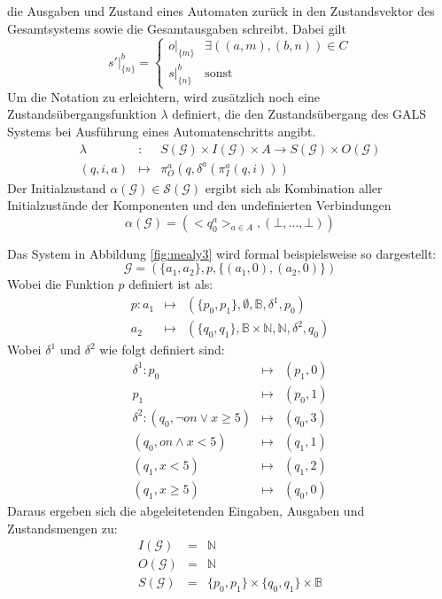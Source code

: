 die Ausgaben und Zustand eines Automaten zurück in den Zustandsvektor des Gesamtsystems sowie die Gesamtausgaben schreibt.
Dabei gilt
\[ s'|_{\{n\}}^b = \left\{\begin{array}{lr}
    o|_{\{m\}} & \exists ((a,m),(b,n))\in C\\[10pt]
    s|_{\{n\}}^b & \textrm{sonst}
  \end{array}\right. \]
Um die Notation zu erleichtern, wird zusätzlich noch eine Zustandsübergangsfunktion $\lambda$ definiert, die den Zustandsübergang des GALS Systems bei Ausführung eines Automatenschritts angibt.
\begin{eqnarray*}
  \lambda &:& S(\mathcal{G})\times I(\mathcal{G})\times A\rightarrow S(\mathcal{G})\times O(\mathcal{G})\\
  (q,i,a) &\mapsto& \pi_O^a(q,\delta^a(\pi_I^a(q,i)))
\end{eqnarray*}
Der Initialzustand $\alpha(\mathcal{G})\in\mathcal{S}(\mathcal{G})$ ergibt sich als Kombination aller Initialzustände der Komponenten und den undefinierten Verbindungen
\[ \alpha(\mathcal{G}) = (<q_0^a>_{a\in A},(\bot,\dots,\bot)) \]

Das System in Abbildung \ref{fig:mealy3} wird formal beispielsweise so dargestellt:
\[ \mathcal{G} = (\{a_1,a_2\},p,\{ (a_1,0),(a_2,0) \}) \]
Wobei die Funktion $p$ definiert ist als:
\begin{eqnarray*}
  p : a_1&\mapsto& (\{p_0,p_1\},\emptyset,\mathbb{B},\delta^1,p_0)\\
      a_2&\mapsto& (\{q_0,q_1\},\mathbb{B}\times\mathbb{N},\mathbb{N},\delta^2,q_0)
\end{eqnarray*}
Wobei $\delta^1$ und $\delta^2$ wie folgt definiert sind:
\begin{eqnarray*}
  \delta^1 : p_0 &\mapsto& (p_1,0)\\
             p_1 &\mapsto& (p_0,1)\\
  \delta^2 : (q_0,\lnot\mathit{on}\lor x\geq 5) &\mapsto& (q_0,3)\\
             (q_0,\mathit{on}\land x<5) &\mapsto& (q_1,1)\\
             (q_1,x<5) &\mapsto& (q_1,2)\\
             (q_1,x\geq 5) &\mapsto& (q_0,0)
\end{eqnarray*}
Daraus ergeben sich die abgeleitetenden Eingaben, Ausgaben und Zustandsmengen zu:
\begin{eqnarray*}
  I(\mathcal{G}) &=& \mathbb{N}\\
  O(\mathcal{G}) &=& \mathbb{N}\\
  S(\mathcal{G}) &=& \{p_0,p_1\}\times\{q_0,q_1\}\times\mathbb{B}
\end{eqnarray*}

